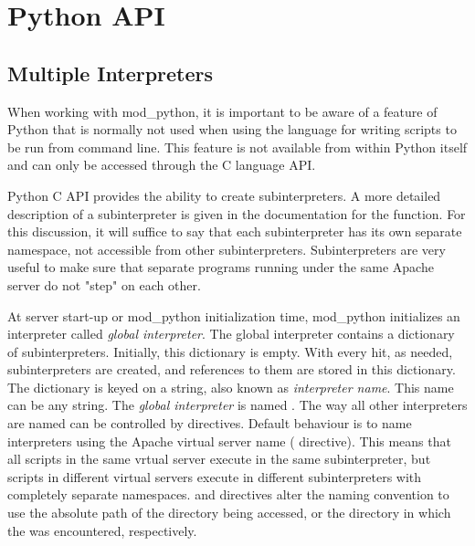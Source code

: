 \chapter{Python API\label{pythonapi}}

\section{Multiple Interpreters\label{pyapi-interps}}
      
When working with mod_python, it is important to be aware of a feature
of Python that is normally not used when using the language for
writing scripts to be run from command line. This feature is not
available from within Python itself and can only be accessed through
the C language API.

Python C API provides the ability to create subinterpreters. A more
detailed description of a subinterpreter is given in the documentation
for the
function. For this discussion, it will suffice to say that each
subinterpreter has its own separate namespace, not accessible from
other subinterpreters. Subinterpreters are very useful to make sure
that separate programs running under the same Apache server do not
"step" on each other.

At server start-up or mod_python initialization time, mod_python
initializes an interpreter called \emph{global interpreter}.  The
global interpreter contains a dictionary of
subinterpreters. Initially, this dictionary is empty. With every hit,
as needed, subinterpreters are created, and references to them are
stored in this dictionary. The dictionary is keyed on a string, also
known as \emph{interpreter name}. This name can be any string.  The
\emph{global interpreter} is named .
The way all other interpreters are named can be controlled by
 directives. Default behaviour is to name interpreters
using the Apache virtual server name (
directive). This means that all scripts in the same vrtual server
execute in the same subinterpreter, but scripts in different virtual
servers execute in different subinterpreters with completely separate
namespaces.  and
 directives alter the naming convention
to use the absolute path of the directory being accessed, or the
directory in which the  was encountered,
respectively.

